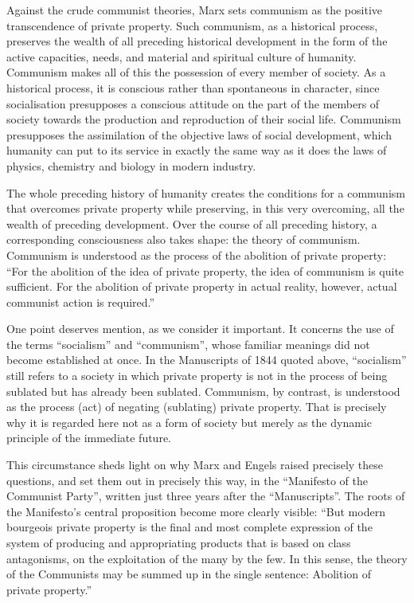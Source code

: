 \documentclass[../main]{subfiles}
\begin{document}
Against the crude communist theories, Marx sets communism as the positive transcendence of private property. Such communism, as a historical process, preserves the wealth of all preceding historical development in the form of the active capacities, needs, and material and spiritual culture of humanity. Communism makes all of this the possession of every member of society. As a historical process, it is conscious rather than spontaneous in character, since socialisation presupposes a conscious attitude on the part of the members of society towards the production and reproduction of their social life. Communism presupposes the assimilation of the objective laws of social development, which humanity can put to its service in exactly the same way as it does the laws of physics, chemistry and biology in modern industry.

The whole preceding history of humanity creates the conditions for a communism that overcomes private property while preserving, in this very overcoming, all the wealth of preceding development. Over the course of all preceding history, a corresponding consciousness also takes shape: the theory of communism. Communism is understood as the process of the abolition of private property: “For the abolition of the idea of private property, the idea of communism is quite sufficient. For the abolition of private property in actual reality, however, actual communist action is required.”

One point deserves mention, as we consider it important. It concerns the use of the terms “socialism” and “communism”, whose familiar meanings did not become established at once. In the Manuscripts of 1844 quoted above, “socialism” still refers to a society in which private property is not in the process of being sublated but has already been sublated. Communism, by contrast, is understood as the process (act) of negating (sublating) private property. That is precisely why it is regarded here not as a form of society but merely as the dynamic principle of the immediate future.

This circumstance sheds light on why Marx and Engels raised precisely these questions, and set them out in precisely this way, in the “Manifesto of the Communist Party”, written just three years after the “Manuscripts”. The roots of the Manifesto’s central proposition become more clearly visible: “But modern bourgeois private property is the final and most complete expression of the system of producing and appropriating products that is based on class antagonisms, on the exploitation of the many by the few. In this sense, the theory of the Communists may be summed up in the single sentence: Abolition of private property.”
\end{document}
